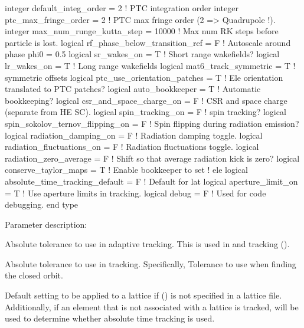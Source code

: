 {\begin{example}
    integer default_integ_order = 2             ! PTC integration order
    integer ptc_max_fringe_order = 2            ! PTC max fringe order (2 => Quadrupole !).
    integer max_num_runge_kutta_step = 10000    ! Max num RK steps before particle is lost.
    logical rf_phase_below_transition_ref = F   ! Autoscale around phase phi0 = 0.5
    logical sr_wakes_on = T                     ! Short range wakefields?
    logical lr_wakes_on = T                     ! Long range wakefields
    logical mat6_track_symmetric = T            ! symmetric offsets
    logical ptc_use_orientation_patches = T     ! Ele orientation translated to PTC patches?
    logical auto_bookkeeper = T                 ! Automatic bookkeeping?
    logical csr_and_space_charge_on = F         ! CSR and space charge (separate from HE SC).
    logical spin_tracking_on = F                ! spin tracking?
    logical spin_sokolov_ternov_flipping_on = F ! Spin flipping during radiation emission?
    logical radiation_damping_on = F            ! Radiation damping toggle.
    logical radiation_fluctuations_on = F       ! Radiation fluctuations toggle.
    logical radiation_zero_average = F          ! Shift so that average radiation kick is zero?
    logical conserve_taylor_maps = T            ! Enable bookkeeper to set
                                                ! ele%
    logical absolute_time_tracking_default = F  ! Default for lat%
    logical aperture_limit_on = T               ! Use aperture limits in tracking.
    logical debug = F                           ! Used for code debugging.
  end type
\end{example}

Parameter description:
\begin{description}
\item[\vn{abs_tol_adaptive_tracking}] \Newline
Absolute tolerance to use in adaptive tracking. This is used in  and
 tracking ().
%
\item[\vn{abs_tol_tracking}] \Newline
Absolute tolerance to use in tracking. Specifically, Tolerance to use when finding the closed orbit.
%
\item[\vn{absolute_time_tracking_default}] \Newline
Default setting to be applied to a lattice if  () is not
specified in a lattice file. Additionally, if an element that is not associated with a lattice is
tracked,  will be used to determine whether absolute time
tracking is used.


\end{description}}
